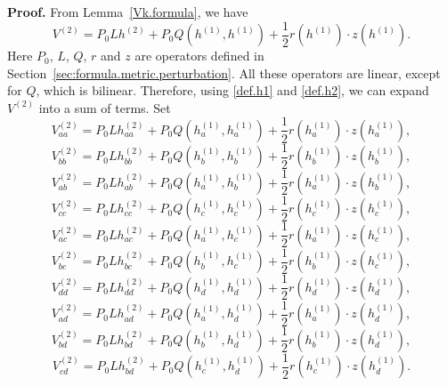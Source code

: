 \documentclass[11pt]{amsart}
\theoremstyle{definition}
\begin{document}
\textbf{Proof.} 
From Lemma~\ref{Vk.formula}, we have 
\[
V^{(2)}=P_0L h^{(2)}+P_0Q(h^{(1)},h^{(1)})+\frac{1}{2}r(h^{(1)})\cdot z(h^{(1)}).
\]
Here $P_0$, $L$, $Q$, $r$ and $z$ are operators defined in Section~\ref{sec:formula.metric.perturbation}.
All these operators are linear, except for $Q$, which is bilinear. 
Therefore, using \eqref{def.h1} and \eqref{def.h2}, we can expand $V^{(2)}$ into a sum of terms.
Set
\begin{equation*}\label{def.V2aa}
V^{(2)}_{aa}=P_0L h^{(2)}_{aa}+P_0Q(h^{(1)}_a,h^{(1)}_a)+\frac{1}{2} r(h^{(1)}_a)\cdot z(h^{(1)}_a),    
\end{equation*}
\begin{equation*}\label{def.V2bb}
V^{(2)}_{bb}=P_0L h^{(2)}_{bb}+P_0Q(h^{(1)}_b,h^{(1)}_b)+\frac{1}{2} r(h^{(1)}_b)\cdot z(h^{(1)}_b),    
\end{equation*}
\begin{equation*}\label{def.V2ab}
V^{(2)}_{ab}=P_0L h^{(2)}_{ab}+P_0Q(h^{(1)}_a,h^{(1)}_b)+\frac{1}{2} r(h^{(1)}_a)\cdot z(h^{(1)}_b),    
\end{equation*}
\begin{equation*}\label{def.V2cc}
V^{(2)}_{cc}=P_0L h^{(2)}_{cc}+P_0Q(h^{(1)}_c,h^{(1)}_c)+\frac{1}{2} r(h^{(1)}_c)\cdot z(h^{(1)}_c),    
\end{equation*}
\begin{equation*}\label{def.V2ac}
V^{(2)}_{ac}=P_0L h^{(2)}_{ac}+P_0Q(h^{(1)}_a,h^{(1)}_c)+\frac{1}{2} r(h^{(1)}_a)\cdot z(h^{(1)}_c),    
\end{equation*}
\begin{equation*}\label{def.V2bc}
V^{(2)}_{bc}=P_0L h^{(2)}_{bc}+P_0Q(h^{(1)}_b,h^{(1)}_c)+\frac{1}{2} r(h^{(1)}_b)\cdot z(h^{(1)}_c),    
\end{equation*}
\begin{equation*}\label{def.V2dd}
V^{(2)}_{dd}=P_0L h^{(2)}_{dd}+P_0Q(h^{(1)}_d,h^{(1)}_d)+\frac{1}{2} r(h^{(1)}_d)\cdot z(h^{(1)}_d),    
\end{equation*}
\begin{equation*}\label{def.V2ad}
V^{(2)}_{ad}=P_0L h^{(2)}_{ad}+P_0Q(h^{(1)}_a,h^{(1)}_d)+\frac{1}{2} r(h^{(1)}_a)\cdot z(h^{(1)}_d),    
\end{equation*}
\begin{equation*}\label{def.V2bd}
V^{(2)}_{bd}=P_0L h^{(2)}_{bd}+P_0Q(h^{(1)}_b,h^{(1)}_d)+\frac{1}{2} r(h^{(1)}_b)\cdot z(h^{(1)}_d),    
\end{equation*}
\begin{equation*}\label{def.V2cd}
V^{(2)}_{cd}=P_0L h^{(2)}_{bd}+P_0Q(h^{(1)}_c,h^{(1)}_d)+\frac{1}{2} r(h^{(1)}_c)\cdot z(h^{(1)}_d).  
\end{equation*}
\end{document}

